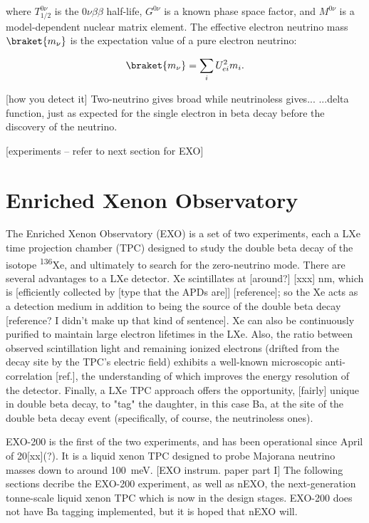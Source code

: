 \noindent
where $T_{1/2}^{0\nu}$ is the $0\nu\beta\beta$ half-life,  $G^{0\nu}$ is a known phase space factor, and $M^{0\nu}$ is a model-dependent nuclear matrix element. The effective electron neutrino mass $\braket{m_{\nu}}$ is the expectation value of a pure electron neutrino:

\begin{equation}
\braket{m_{\nu}} = \sum\limits_{i} U_{ei}^{2} m_{i}.
\label{eqn:effectivemass}
\end{equation}

[how you detect it]
Two-neutrino gives broad while neutrinoless gives...
...delta function, just as expected for the single electron in beta decay before the discovery of the neutrino.

[experiments -- refer to next section for EXO]

\section{Enriched Xenon Observatory}

The Enriched Xenon Observatory (EXO) is a set of two experiments, each a LXe time projection chamber (TPC) designed to study the double beta decay of the isotope \textsuperscript{136}Xe, and ultimately to search for the zero-neutrino mode.  There are several advantages to a LXe detector.  Xe scintillates at [around?] [xxx] nm, which is [efficiently collected by [type that the APDs are]] [reference]; so the Xe acts as a detection medium in addition to being the source of the double beta decay [reference? I didn't make up that kind of sentence].  Xe can also be continuously purified to maintain large electron lifetimes in the LXe.  Also, the ratio between observed scintillation light and remaining ionized electrons (drifted from the decay site by the TPC's electric field) exhibits a well-known microscopic anti-correlation [ref.], the understanding of which improves the energy resolution of the detector.  Finally, a LXe TPC approach offers the opportunity, [fairly] unique in double beta decay, to "tag" the daughter, in this case Ba, at the site of the double beta decay event (specifically, of course, the neutrinoless ones).

EXO-200 is the first of the two experiments, and has been operational since April of 20[xx](?).  It is a liquid xenon TPC designed to probe Majorana neutrino masses down to around 100~meV.  [EXO instrum. paper part I]  The following sections decribe the EXO-200 experiment, as well as nEXO, the next-generation tonne-scale liquid xenon TPC which is now in the design stages.  EXO-200 does not have Ba tagging implemented, but it is hoped that nEXO will.


